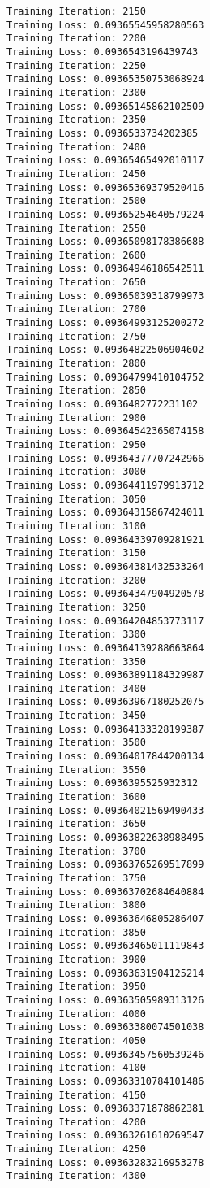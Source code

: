 \documentclass[11pt]{article}
\begin{document}
\begin{Verbatim}[commandchars=\\\{\}]
Training Iteration: 2150
Training Loss: 0.09365545958280563
Training Iteration: 2200
Training Loss: 0.0936543196439743
Training Iteration: 2250
Training Loss: 0.09365350753068924
Training Iteration: 2300
Training Loss: 0.09365145862102509
Training Iteration: 2350
Training Loss: 0.0936533734202385
Training Iteration: 2400
Training Loss: 0.09365465492010117
Training Iteration: 2450
Training Loss: 0.09365369379520416
Training Iteration: 2500
Training Loss: 0.09365254640579224
Training Iteration: 2550
Training Loss: 0.09365098178386688
Training Iteration: 2600
Training Loss: 0.09364946186542511
Training Iteration: 2650
Training Loss: 0.09365039318799973
Training Iteration: 2700
Training Loss: 0.09364993125200272
Training Iteration: 2750
Training Loss: 0.09364822506904602
Training Iteration: 2800
Training Loss: 0.09364799410104752
Training Iteration: 2850
Training Loss: 0.0936482772231102
Training Iteration: 2900
Training Loss: 0.09364542365074158
Training Iteration: 2950
Training Loss: 0.09364377707242966
Training Iteration: 3000
Training Loss: 0.09364411979913712
Training Iteration: 3050
Training Loss: 0.09364315867424011
Training Iteration: 3100
Training Loss: 0.09364339709281921
Training Iteration: 3150
Training Loss: 0.09364381432533264
Training Iteration: 3200
Training Loss: 0.09364347904920578
Training Iteration: 3250
Training Loss: 0.09364204853773117
Training Iteration: 3300
Training Loss: 0.09364139288663864
Training Iteration: 3350
Training Loss: 0.09363891184329987
Training Iteration: 3400
Training Loss: 0.09363967180252075
Training Iteration: 3450
Training Loss: 0.09364133328199387
Training Iteration: 3500
Training Loss: 0.09364017844200134
Training Iteration: 3550
Training Loss: 0.0936395525932312
Training Iteration: 3600
Training Loss: 0.09364021569490433
Training Iteration: 3650
Training Loss: 0.09363822638988495
Training Iteration: 3700
Training Loss: 0.09363765269517899
Training Iteration: 3750
Training Loss: 0.09363702684640884
Training Iteration: 3800
Training Loss: 0.09363646805286407
Training Iteration: 3850
Training Loss: 0.09363465011119843
Training Iteration: 3900
Training Loss: 0.09363631904125214
Training Iteration: 3950
Training Loss: 0.09363505989313126
Training Iteration: 4000
Training Loss: 0.09363380074501038
Training Iteration: 4050
Training Loss: 0.09363457560539246
Training Iteration: 4100
Training Loss: 0.09363310784101486
Training Iteration: 4150
Training Loss: 0.09363371878862381
Training Iteration: 4200
Training Loss: 0.09363261610269547
Training Iteration: 4250
Training Loss: 0.09363283216953278
Training Iteration: 4300

\end{Verbatim}
\end{document}
